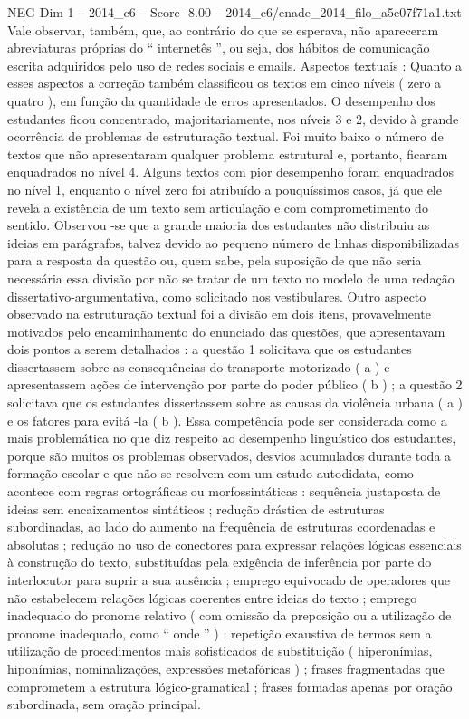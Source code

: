 \begin{textsample}{NEG Dim 1 – 2014\_c6 – Score -8.00 – 2014\_c6/enade\_2014\_filo\_a5e07f71a1.txt}
Vale observar, também, que, ao contrário do que se esperava, não apareceram abreviaturas próprias do “ internetês ”, ou seja, dos hábitos de comunicação escrita adquiridos pelo uso de redes sociais e emails.
Aspectos textuais : Quanto a esses aspectos a correção também classificou os textos em cinco níveis ( zero a quatro ), em função da quantidade de erros apresentados.
O desempenho dos estudantes ficou concentrado, majoritariamente, nos níveis 3 e 2, devido à grande ocorrência de problemas de estruturação textual.
Foi muito baixo o número de textos que não apresentaram qualquer problema estrutural e, portanto, ficaram enquadrados no nível 4.
Alguns textos com pior desempenho foram enquadrados no nível 1, enquanto o nível zero foi atribuído a pouquíssimos casos, já que ele revela a existência de um texto sem articulação e com comprometimento do sentido.
Observou -se que a grande maioria dos estudantes não distribuiu as ideias em parágrafos, talvez devido ao pequeno número de linhas disponibilizadas para a resposta da questão ou, quem sabe, pela suposição de que não seria necessária essa divisão por não se tratar de um texto no modelo de uma redação dissertativo-argumentativa, como solicitado nos vestibulares.
Outro aspecto observado na estruturação textual foi a divisão em dois itens, provavelmente motivados pelo encaminhamento do enunciado das questões, que apresentavam dois pontos a serem detalhados : a questão 1 solicitava que os estudantes dissertassem sobre as consequências do transporte motorizado ( a ) e apresentassem ações de intervenção por parte do poder público ( b ) ; a questão 2 solicitava que os estudantes dissertassem sobre as causas da violência urbana ( a ) e os fatores para evitá -la ( b ).
Essa competência pode ser considerada como a mais problemática no que diz respeito ao desempenho linguístico dos estudantes, porque são muitos os problemas observados, desvios acumulados durante toda a formação escolar e que não se resolvem com um estudo autodidata, como acontece com regras ortográficas ou morfossintáticas : sequência justaposta de ideias sem encaixamentos sintáticos ; redução drástica de estruturas subordinadas, ao lado do aumento na frequência de estruturas coordenadas e absolutas ; redução no uso de conectores para expressar relações lógicas essenciais à construção do texto, substituídas pela exigência de inferência por parte do interlocutor para suprir a sua ausência ; emprego equivocado de operadores que não estabelecem relações lógicas coerentes entre ideias do texto ; emprego inadequado do pronome relativo ( com omissão da preposição ou a utilização de pronome inadequado, como “ onde ” ) ; repetição exaustiva de termos sem a utilização de procedimentos mais sofisticados de substituição ( hiperonímias, hiponímias, nominalizações, expressões metafóricas ) ; frases fragmentadas que comprometem a estrutura lógico-gramatical ; frases formadas apenas por oração subordinada, sem oração principal.

\end{textsample}
